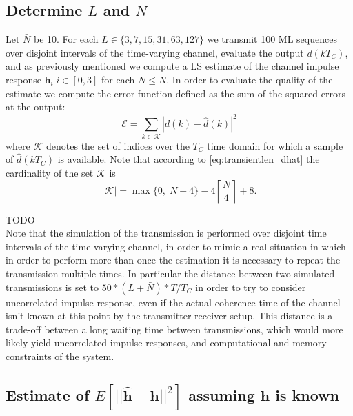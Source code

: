 \documentclass[10pt]{article}
\begin{document}
\subsection*{Determine $L$ and $N$}
Let $\bar{N}$ be 10. For each $L \in \{3, 7, 15, 31, 63, 127\}$ we transmit 100 ML sequences over disjoint intervals of the time-varying channel, evaluate the output $d(kT_C)$, and as previously mentioned we compute a LS estimate of the channel impulse response $\mathbf{h}_i \; i \in [0,3]$ for each $N \leq \bar{N}$. In order to evaluate the quality of the estimate we compute the error function defined as the sum of the squared errors at the output:
\begin{equation}
	\mathcal{E} = \sum_{k \in \mathcal{K}} |d(k)-\hat{d}(k)|^2
\end{equation}
where $\mathcal{K}$ denotes the set of indices over the $T_C$ time domain for which a sample of $\hat{d}(kT_C)$ is available. Note that according to \eqref{eq:transientlen_dhat} the cardinality of the set $\mathcal{K}$ is
\begin{equation}
|\mathcal{K}| = \max \{ 0, \; N-4 \} - 4 \left\lceil \frac{N}{4} \right\rceil + 8.
\end{equation}



TODO\\

Note that the simulation of the transmission is performed over disjoint time intervals of the time-varying channel, in order to mimic a real situation in which in order to perform more than once the estimation it is necessary to repeat the transmission multiple times. In particular the distance between two simulated transmissions is set to $50*(L+\bar{N})*T/T_C$ in order to try to consider uncorrelated impulse response, even if the actual coherence time of the channel isn't known at this point by the transmitter-receiver setup. This distance is a trade-off between a long waiting time between transmissions, which would more likely yield uncorrelated impulse responses, and computational and memory constraints of the system.


\subsection*{Estimate of $E[||\mathbf{\hat{h}}-\mathbf{h}||^2]$ assuming $\mathbf{h}$ is known}
\end{document}
